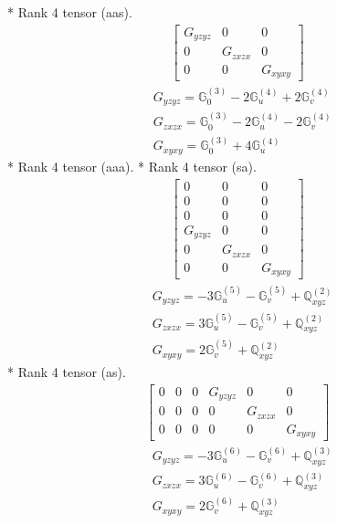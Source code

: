 \documentclass[fleqn,8pt,landscape]{jsarticle}
\begin{document}
* Rank 4 tensor (aas).
\begin{align*}
\begin{bmatrix} G_{yzyz} & 0 & 0 \\ 0 & G_{zxzx} & 0 \\ 0 & 0 & G_{xyxy} \end{bmatrix}
\end{align*}
\begin{align*}
& G_{yzyz} = \mathbb{G}_{0}^{(3)} - 2 \mathbb{G}_{u}^{(4)} + 2 \mathbb{G}_{v}^{(4)} \\
& G_{zxzx} = \mathbb{G}_{0}^{(3)} - 2 \mathbb{G}_{u}^{(4)} - 2 \mathbb{G}_{v}^{(4)} \\
& G_{xyxy} = \mathbb{G}_{0}^{(3)} + 4 \mathbb{G}_{u}^{(4)}
\end{align*}
* Rank 4 tensor (aaa).
* Rank 4 tensor (sa).
\begin{align*}
\begin{bmatrix} 0 & 0 & 0 \\ 0 & 0 & 0 \\ 0 & 0 & 0 \\ G_{yzyz} & 0 & 0 \\ 0 & G_{zxzx} & 0 \\ 0 & 0 & G_{xyxy} \end{bmatrix}
\end{align*}
\begin{align*}
& G_{yzyz} = - 3 \mathbb{G}_{u}^{(5)} - \mathbb{G}_{v}^{(5)} + \mathbb{Q}_{xyz}^{(2)} \\
& G_{zxzx} = 3 \mathbb{G}_{u}^{(5)} - \mathbb{G}_{v}^{(5)} + \mathbb{Q}_{xyz}^{(2)} \\
& G_{xyxy} = 2 \mathbb{G}_{v}^{(5)} + \mathbb{Q}_{xyz}^{(2)}
\end{align*}
* Rank 4 tensor (as).
\begin{align*}
\begin{bmatrix} 0 & 0 & 0 & G_{yzyz} & 0 & 0 \\ 0 & 0 & 0 & 0 & G_{zxzx} & 0 \\ 0 & 0 & 0 & 0 & 0 & G_{xyxy} \end{bmatrix}
\end{align*}
\begin{align*}
& G_{yzyz} = - 3 \mathbb{G}_{u}^{(6)} - \mathbb{G}_{v}^{(6)} + \mathbb{Q}_{xyz}^{(3)} \\
& G_{zxzx} = 3 \mathbb{G}_{u}^{(6)} - \mathbb{G}_{v}^{(6)} + \mathbb{Q}_{xyz}^{(3)} \\
& G_{xyxy} = 2 \mathbb{G}_{v}^{(6)} + \mathbb{Q}_{xyz}^{(3)}
\end{align*}
\end{document}

